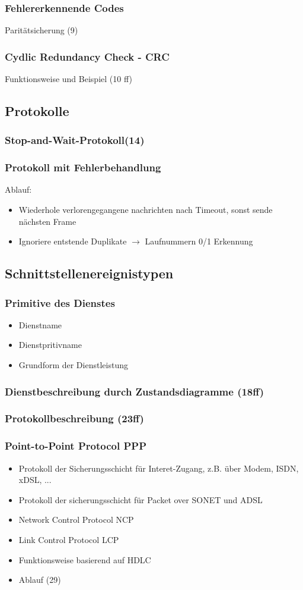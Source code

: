 \subsubsection{Fehlererkennende Codes}
Paritätsicherung (9)
\subsubsection{Cydlic Redundancy Check - CRC}
Funktionsweise und Beispiel (10 ff)
\subsection{Protokolle}
\subsubsection{Stop-and-Wait-Protokoll(14)}
\subsubsection{Protokoll mit Fehlerbehandlung}
Ablauf:
\begin{itemize}
	\item Wiederhole verlorengegangene nachrichten nach Timeout, sonst sende nächsten Frame
	\item Ignoriere entstende Duplikate \(\to\) Laufnummern 0/1 Erkennung
\end{itemize}
\subsection{Schnittstellenereignistypen}
\subsubsection{Primitive des Dienstes}
\begin{itemize}
	\item Dienstname
	\item Dienstpritivname
	\item Grundform der Dienstleistung
\end{itemize}
\subsubsection{Dienstbeschreibung durch Zustandsdiagramme (18ff)}
\subsubsection{Protokollbeschreibung (23ff)}
\subsubsection{Point-to-Point Protocol PPP}
\begin{itemize}
\item Protokoll der Sicherungsschicht für Interet-Zugang, z.B. über Modem, ISDN, xDSL, ...
\item Protokoll der sicherungsschicht für Packet over SONET und ADSL
\item Network Control Protocol NCP
\item Link Control Protocol LCP
\item Funktionsweise basierend auf HDLC
\item Ablauf (29)
\end{itemize}
